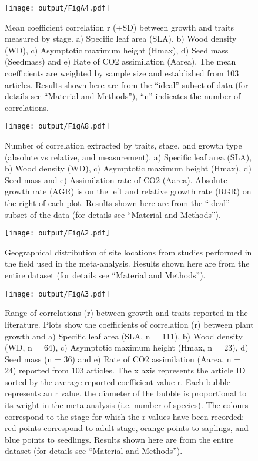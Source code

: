 \documentclass[10pt,twoside]{article}\usepackage[]{graphicx}\usepackage[]{color}
\begin{document}
\begin{figure}[h!]
\centering
\texttt{[image: output/FigA4.pdf]}
\caption{Mean coefficient correlation r (+SD) between growth and traits measured by stage.  a) Specific leaf area (SLA), b) Wood density (WD), c) Asymptotic maximum height (Hmax), d) Seed mass (Seedmass) and e) Rate of CO2 assimilation (Aarea). The mean coefficients are weighted by sample size and established from 103 articles. Results shown here are from the ``ideal'' subset of data (for details see ``Material and Methods''), ``n'' indicates the number of correlations.}
\label{fig:figA4}
\end{figure}



\begin{figure}[h!]
\centering
\texttt{[image: output/FigA8.pdf]}
\caption{Number of correlation extracted by traits, stage, and growth type (absolute vs relative, and measurement). a) Specific leaf area (SLA), b) Wood density (WD), c) Asymptotic maximum height (Hmax), d) Seed mass and e) Assimilation rate of CO2 (Aarea). Absolute growth rate (AGR) is on the left and relative growth rate (RGR) on the right of each plot. Results shown here are from the ``ideal'' subset of the data (for details see ``Material and Methods''). }
\label{fig:figA8}
\end{figure}



\begin{figure}[h!]
\centering
\texttt{[image: output/FigA2.pdf]}
\caption{Geographical distribution of site locations from studies performed in the field used in the meta-analysis. Results shown here are from the entire dataset (for details see ``Material and Methods'').}
\label{fig:figA2}
\end{figure}


\begin{figure}[h!]
\centering
\texttt{[image: output/FigA3.pdf]}
\caption{Range of correlations (r) between
growth and traits reported in the literature. Plots show the coefficients of correlation (r)
between plant growth and a) Specific leaf area (SLA, n =
111), b) Wood density (WD, n = 64), c) Asymptotic
maximum height (Hmax, n = 23), d) Seed mass (n = 36) and
e) Rate of CO2 assimilation (Aarea, n = 24) reported from 103
articles. The x axis represents the article ID sorted by the average reported coefficient value r. Each bubble represents an r value, the diameter of the bubble is proportional to its weight in the meta-analysis (i.e. number of species). The colours correspond to the stage for which the r values have been recorded: red points correspond to adult stage, orange points to saplings, and blue points to seedlings. Results shown here are from the entire dataset (for details see ``Material and Methods''). }
\label{fig:figA3}
\end{figure}
\end{document}
